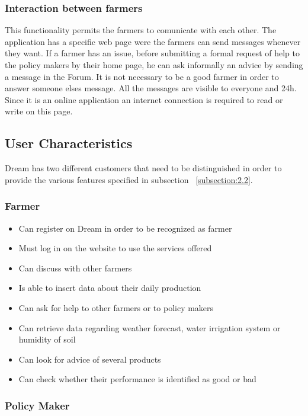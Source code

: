\subsubsection{Interaction between farmers}
This functionality permits the farmers to comunicate with each other. 
The application has a specific web page were the farmers can send messages 
whenever they want.
If a farmer has an issue, before submitting a formal request of help to 
the policy makers 
by their home page, he can ask informally an advice by sending a message 
in the Forum.
It is not necessary to be a good farmer in order to answer someone elses 
message. All the messages are visible to everyone and 24h. 
Since it is an online application an internet connection is required 
to read or write on this page.

\subsection{User Characteristics}
Dream has two different customers that need to be 
distinguished in order to provide the various 
features specified in subsection ~\ref{subsection:2.2}.

\subsubsection{Farmer}
\begin{itemize}
    \renewcommand\labelitemi{--}
    \item Can register on Dream in order to be recognized as farmer
    \item Must log in on the website to use the services offered
    \item Can discuss with other farmers
    \item Is able to insert data about their daily production
    \item Can ask for help to other farmers or to policy makers
    \item Can retrieve data regarding weather forecast, water irrigation system or humidity of soil
    \item Can look for advice of several products
    \item Can check whether their performance is identified as good or bad
\end{itemize}

\subsubsection{Policy Maker}

